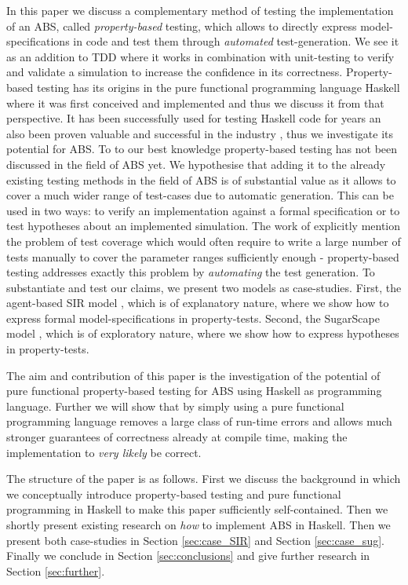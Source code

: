 In this paper we discuss a complementary method of testing the implementation of an ABS, called \textit{property-based} testing, which allows to directly express model-specifications in code and test them through \textit{automated} test-generation. We see it as an addition to TDD where it works in combination with unit-testing to verify and validate a simulation to increase the confidence in its correctness. Property-based testing has its origins \cite{claessen_quickcheck:_2000, claessen_testing_2002, runciman_smallcheck_2008} in the pure functional programming language Haskell \cite{hudak_history_2007} where it was first conceived and implemented and thus we discuss it from that perspective. It has been successfully used for testing Haskell code for years an also been proven valuable and successful in the industry \cite{hughes_quickcheck_2007}, thus we investigate its potential for ABS. To to our best knowledge property-based testing has not been discussed in the field of ABS yet. 
We hypothesise that adding it to the already existing testing methods in the field of ABS is of substantial value as it allows to cover a much wider range of test-cases due to automatic generation. This can be used in two ways: to verify an implementation against a formal specification or to test hypotheses about an implemented simulation. The work of \cite{onggo_test-driven_2016} explicitly mention the problem of test coverage which would often require to write a large number of tests manually to cover the parameter ranges sufficiently enough - property-based testing addresses exactly this problem by \textit{automating} the test generation.
To substantiate and test our claims, we present two models as case-studies. First, the agent-based SIR model \cite{macal_agent-based_2010}, which is of explanatory nature, where we show how to express formal model-specifications in property-tests. Second, the SugarScape model \cite{epstein_growing_1996}, which is of exploratory nature, where we show how to express hypotheses in property-tests. 

The aim and contribution of this paper is the investigation of the potential of pure functional property-based testing for ABS using Haskell as programming language. Further we will show that by simply using a pure functional programming language removes a large class of run-time errors and allows much stronger guarantees of correctness already at compile time, making the implementation to \textit{very likely} be correct.

The structure of the paper is as follows. First we discuss the background in which we conceptually introduce property-based testing and pure functional programming in Haskell to make this paper sufficiently self-contained. Then we shortly present existing research on \textit{how} to implement ABS in Haskell. Then we present both case-studies in Section \ref{sec:case_SIR} and Section \ref{sec:case_sug}. Finally we conclude in Section \ref{sec:conclusions} and give further research in Section \ref{sec:further}. 